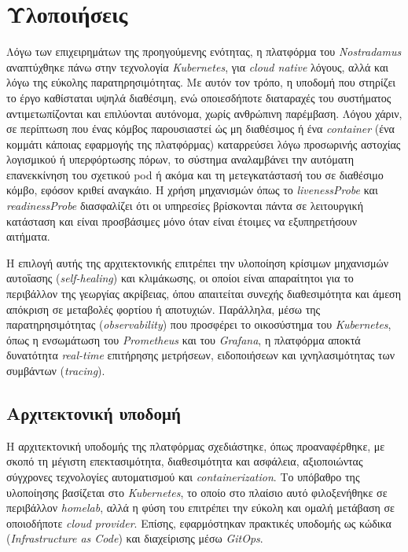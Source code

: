 \chapter{Υλοποιήσεις}

Λόγω των επιχειρημάτων της προηγούμενης ενότητας, η πλατφόρμα του
\textit{Nostradamus} αναπτύχθηκε πάνω στην τεχνολογία \textit{Kubernetes}, για
\textit{cloud native} λόγους, αλλά και λόγω της εύκολης παρατηρησιμότητας. Με
αυτόν τον τρόπο, η υποδομή που στηρίζει το έργο καθίσταται υψηλά διαθέσιμη, ενώ
οποιεσδήποτε διαταραχές του συστήματος αντιμετωπίζονται και επιλύονται
αυτόνομα, χωρίς ανθρώπινη παρέμβαση. Λόγου χάριν, σε περίπτωση που ένας κόμβος
παρουσιαστεί ώς μη διαθέσιμος ή ένα \textit{container} (ένα κομμάτι κάποιας
εφαρμογής της πλατφόρμας) καταρρεύσει λόγω προσωρινής αστοχίας λογισμικού ή
υπερφόρτωσης πόρων, το σύστημα αναλαμβάνει την αυτόματη επανεκκίνηση του
σχετικού pod ή ακόμα και τη μετεγκατάστασή του σε διαθέσιμο κόμβο, εφόσον
κριθεί αναγκάιο. Η χρήση μηχανισμών όπως το \textit{livenessProbe} και
\textit{readinessProbe} διασφαλίζει ότι οι υπηρεσίες βρίσκονται πάντα σε
λειτουργική κατάσταση και είναι προσβάσιμες μόνο όταν είναι έτοιμες να
εξυπηρετήσουν αιτήματα.

Η επιλογή αυτής της αρχιτεκτονικής επιτρέπει την υλοποίηση κρίσιμων μηχανισμών
αυτοΐασης (\textit{self-healing}) και κλιμάκωσης, οι οποίοι είναι απαραίτητοι
για το περιβάλλον της γεωργίας ακρίβειας, όπου απαιτείται συνεχής διαθεσιμότητα
και άμεση απόκριση σε μεταβολές φορτίου ή αποτυχιών. Παράλληλα, μέσω της
παρατηρησιμότητας (\textit{observability}) που προσφέρει το οικοσύστημα του
\textit{Kubernetes}, όπως η ενσωμάτωση του \textit{Prometheus} και του
\textit{Grafana}, η πλατφόρμα αποκτά δυνατότητα \textit{real-time} επιτήρησης
μετρήσεων, ειδοποιήσεων και ιχνηλασιμότητας των συμβάντων (\textit{tracing}).

\section{Αρχιτεκτονική υποδομή}

Η αρχιτεκτονική υποδομής της πλατφόρμας σχεδιάστηκε, όπως προαναφέρθηκε, με
σκοπό τη μέγιστη επεκτασιμότητα, διαθεσιμότητα και ασφάλεια, αξιοποιώντας
σύγχρονες τεχνολογίες αυτοματισμού και \textit{containerization}. Το υπόβαθρο
της υλοποίησης βασίζεται στο \textit{Kubernetes}, το οποίο στο πλαίσιο αυτό
φιλοξενήθηκε σε περιβάλλον \textit{homelab}, αλλά η φύση του επιτρέπει την
εύκολη και ομαλή μετάβαση σε οποιοδήποτε \textit{cloud provider}. Επίσης,
εφαρμόστηκαν πρακτικές υποδομής ως κώδικα (\textit{Infrastructure as Code}) και
διαχείρισης μέσω \textit{GitOps}.

